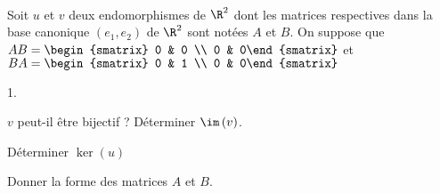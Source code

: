 \documentclass[11pt]{article}%
\begin{document}
\begin{exerciceSP}~\\
  Soit $u$ et $v$ deux endomorphismes de $\R^{2}$ dont les matrices
  respectives dans la base canonique $\left( e_{1},e_{2}\right) $ de
  $\R^{2}$ sont notées $A$ et $B$. On suppose que $AB=%
  \begin{smatrix}
    0 & 0 \\ 
    0 & 0%
  \end{smatrix}%
  $ et $BA=%
  \begin{smatrix}
    0 & 1 \\ 
    0 & 0%
  \end{smatrix}%
  $

  \begin{noliste}{1.}
    \setlength{\itemsep}{2mm}
  \item $v$ peut-il être bijectif ? Déterminer $\im \left( v\right) $.

  \item Déterminer $\ker \left( u\right) $

  \item Donner la forme des matrices $A$ et $B$.
  \end{noliste}
\end{exerciceSP}


\newpage
\end{document}
